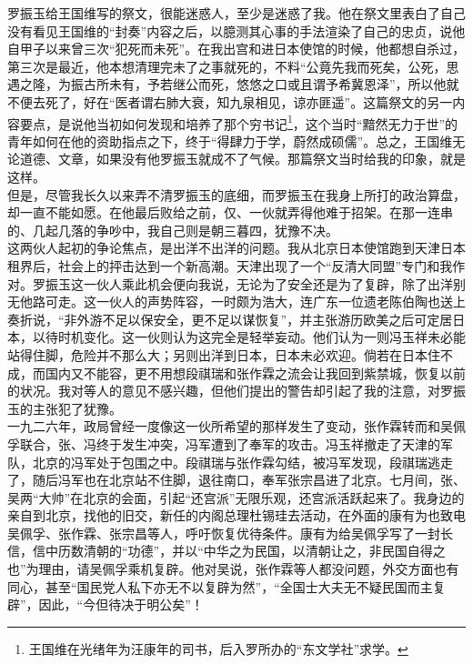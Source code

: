 罗振玉给王国维写的祭文，很能迷惑人，至少是迷惑了我。他在祭文里表白了自己没有看见王国维的“封奏”内容之后，以臆测其心事的手法渲染了自己的忠贞，说他自甲子以来曾三次“犯死而未死”。在我出宫和进日本使馆的时候，他都想自杀过，第三次是最近，他本想清理完未了之事就死的，不料“公竟先我而死矣，公死，思遇之隆，为振古所未有，予若继公而死，悠悠之口或且谓予希冀恩泽”，所以他就不便去死了，好在“医者谓右肺大衰，知九泉相见，谅亦匪遥”。这篇祭文的另一内容要点，是说他当初如何发现和培养了那个穷书记\footnote{王国维在光绪年为汪康年的司书，后入罗所办的“东文学社”求学。}，这个当时“黯然无力于世”的青年如何在他的资助指点之下，终于“得肆力于学，蔚然成硕儒”。总之，王国维无论道德、文章，如果没有他罗振玉就成不了气候。那篇祭文当时给我的印象，就是这样。\\

但是，尽管我长久以来弄不清罗振玉的底细，而罗振玉在我身上所打的政治算盘，却一直不能如愿。在他最后败给之前，仅、一伙就弄得他难于招架。在那一连串的、几起几落的争吵中，我自己则是朝三暮四，犹豫不决。\\

这两伙人起初的争论焦点，是出洋不出洋的问题。我从北京日本使馆跑到天津日本租界后，社会上的抨击达到一个新高潮。天津出现了一个“反清大同盟”专门和我作对。罗振玉这一伙人乘此机会便向我说，无论为了安全还是为了复辟，除了出洋别无他路可走。这一伙人的声势阵容，一时颇为浩大，连广东一位遗老陈伯陶也送上奏折说，“非外游不足以保安全，更不足以谋恢复”，并主张游历欧美之后可定居日本，以待时机变化。这一伙则认为这完全是轻举妄动。他们认为一则冯玉祥未必能站得住脚，危险并不那么大；另则出洋到日本，日本未必欢迎。倘若在日本住不成，而国内又不能容，更不用想段祺瑞和张作霖之流会让我回到紫禁城，恢复以前的状况。我对等人的意见不感兴趣，但他们提出的警告却引起了我的注意，对罗振玉的主张犯了犹豫。\\

一九二六年，政局曾经一度像这一伙所希望的那样发生了变动，张作霖转而和吴佩孚联合，张、冯终于发生冲突，冯军遭到了奉军的攻击。冯玉祥撤走了天津的军队，北京的冯军处于包围之中。段祺瑞与张作霖勾结，被冯军发现，段祺瑞逃走了，随后冯军也在北京站不住脚，退往南口，奉军张宗昌进了北京。七月间，张、吴两“大帅”在北京的会面，引起“还宫派”无限乐观，还宫派活跃起来了。我身边的亲自到北京，找他的旧交，新任的内阁总理杜锡珪去活动，在外面的康有为也致电吴佩孚、张作霖、张宗昌等人，呼吁恢复优待条件。康有为给吴佩孚写了一封长信，信中历数清朝的“功德”，并以“中华之为民国，以清朝让之，非民国自得之也”为理由，请吴佩孚乘机复辟。他对吴说，张作霖等人都没问题，外交方面也有同心，甚至“国民党人私下亦无不以复辟为然”，“全国士大夫无不疑民国而主复辟”，因此，“今但待决于明公矣”！\\


